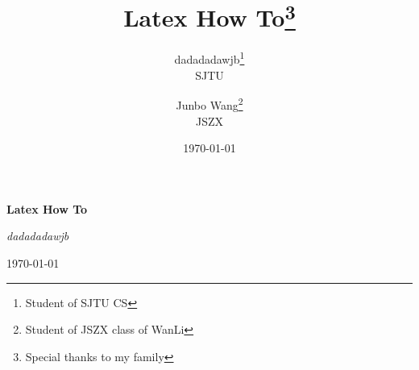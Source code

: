 \documentclass[zihao=5, sub3section, UTF8, fontset=windows, scheme=plain, punct]{ctexart} %
\title{Latex How To\thanks{Special thanks to my family}}
\author{dadadadawjb\thanks{Student of SJTU CS}\\SJTU \and Junbo Wang\thanks{Student of JSZX class of WanLi}\\JSZX}
\date{\today}
\begin{document}
    \begin{titlepage}
        \vspace*{\fill}
        \begin{center}
            \normalfont
            {\Huge\bfseries Latex How To}

            \bigskip
            {\Large\itshape dadadadawjb}

            \medskip
            \today
        \end{center}
    \end{titlepage}


    \maketitle

    \tableofcontents

    \listoffigures

    \listoftables

    
    \listofmynewfloats                              %

    

    

    

    

    

    

    

    

    

    

    

    

    
\end{document}
